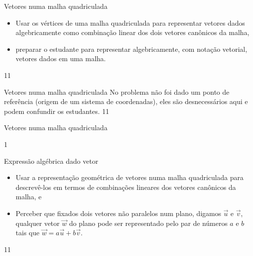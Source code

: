 \cleardoublepage

\def\currentcolor{session1}
\begin{objectives}{Vetores numa malha quadriculada}
{
 \begin{itemize}
\item {} 
Usar os vértices de uma malha quadriculada para representar vetores dados algebricamente como combinação linear dos dois vetores canônicos da malha,

\item {} 
preparar o estudante para representar algebricamente, com notação vetorial, vetores dados em uma malha.

\end{itemize}
}{1}{1}
\end{objectives}
\marginpar{\vspace{-2em}}
\begin{sugestions}{Vetores numa malha quadriculada}
{
No problema não foi dado um ponto de referência (origem de um sistema de coordenadas), eles são desnecessários aqui e podem confundir os estudantes.
}{1}{1}
\end{sugestions}
\marginpar{\vspace{-1em}}
\begin{answer}{Vetores numa malha quadriculada}
{
\begin{center}\end{center}
}{1}
\end{answer}
\marginpar{\vspace{-1em}}
\begin{objectives}{Expressão algébrica dado vetor}
{
\begin{itemize}
\item Usar a representação geométrica de vetores numa malha quadriculada para descrevê-los em termos de combinações lineares dos vetores canônicos da malha, e
\item Perceber que fixados dois vetores não paralelos num plano, digamos \(\vec{u}\) e \(\vec{v}\), qualquer vetor \(\vec{w}\) do plano pode ser representado pelo par de números \(a\) e \(b\) tais que \(\vec{w}=a\vec{u}+b\vec{v}\).
\end{itemize}
}{1}{1}
\end{objectives}
